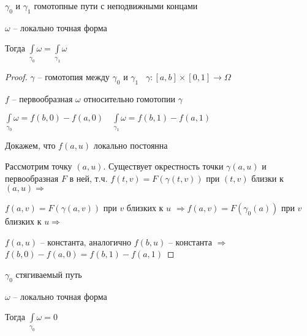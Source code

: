 
\begin{theorem}\thmslashn
	
	$\gamma_0$ и $\gamma_1$ гомотопные пути с неподвижными концами 
	
	$\omega$ -- локально точная форма
	
	Тогда $\int\limits_{\gamma_0} \omega = \int\limits_{\gamma_1} \omega$
	
\end{theorem}

\begin{proof}\thmslashn
	
	$\gamma$ -- гомотопия между $\gamma_0$ и $\gamma_1\;\;\; \gamma:[a, b]\times[0, 1] \to \Omega$
	
	$f$ -- первообразная $\omega$ относительно гомотопии $\gamma$ 
	
	$\int\limits_{\gamma_0} \omega = f(b, 0) - f(a, 0) \quad \int\limits_{\gamma_1} \omega = f(b, 1) - f(a, 1)$
	
	Докажем, что $f(a, u)$ локально постоянна
	
	Рассмотрим точку $(a, u)$. Существует окрестность точки $\gamma(a, u)$ и первообразная $F$ в ней, т.ч. $f(t, v) = F(\gamma(t, v))$ при $(t, v)$ близки к $(a, u) \Rightarrow$
	
	$f(a, v) = F(\gamma(a, v))$ при $v$ близких к $u$ $\Rightarrow f(a, v) = F(\gamma_0(a))$ при $v$ близких к $u \Rightarrow$ 
	
	$f(a, u)$ -- константа, аналогично $f(b, u)$ -- константа $\Rightarrow$ $f(b, 0) - f(a, 0) = f(b, 1) - f(a, 1)$
	
\end{proof}

\begin{theorem}\thmslashn
	
	$\gamma_0$ стягиваемый путь
	
	$\omega$ -- локально точная форма
	
	Тогда $\int\limits_{\gamma_0} \omega = 0$
	
\end{theorem}

